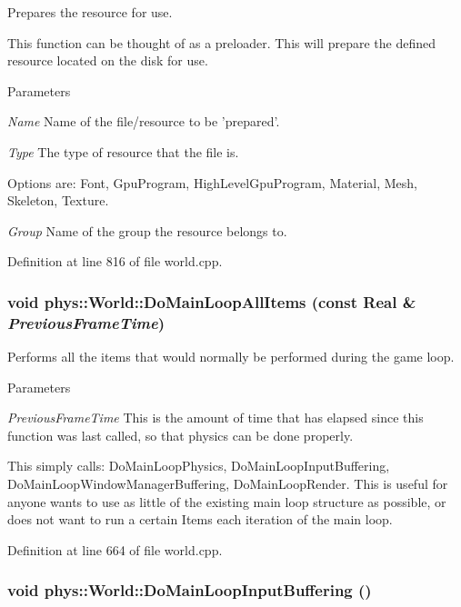 Prepares the resource for use. 

This function can be thought of as a preloader. This will prepare the defined resource located on the disk for use. 
\begin{DoxyParams}{Parameters}
\item[{\em Name}]Name of the file/resource to be 'prepared'. \item[{\em Type}]The type of resource that the file is. \par
 Options are: Font, GpuProgram, HighLevelGpuProgram, Material, Mesh, Skeleton, Texture. \item[{\em Group}]Name of the group the resource belongs to. \end{DoxyParams}


Definition at line 816 of file world.cpp.

\hypertarget{classphys_1_1World_a25c2583425bfe3d0d2bfce1093f0175e}{
\subsubsection[{DoMainLoopAllItems}]{\setlength{\rightskip}{0pt plus 5cm}void phys::World::DoMainLoopAllItems (const {\bf Real} \& {\em PreviousFrameTime})}}
\label{da/ddf/classphys_1_1World_a25c2583425bfe3d0d2bfce1093f0175e}


Performs all the items that would normally be performed during the game loop. 


\begin{DoxyParams}{Parameters}
\item[{\em PreviousFrameTime}]This is the amount of time that has elapsed since this function was last called, so that physics can be done properly.\end{DoxyParams}
This simply calls: DoMainLoopPhysics, DoMainLoopInputBuffering, DoMainLoopWindowManagerBuffering, DoMainLoopRender. This is useful for anyone wants to use as little of the existing main loop structure as possible, or does not want to run a certain Items each iteration of the main loop. 

Definition at line 664 of file world.cpp.

\hypertarget{classphys_1_1World_af4204b587fcc71e8313dd97d476378d6}{
\subsubsection[{DoMainLoopInputBuffering}]{\setlength{\rightskip}{0pt plus 5cm}void phys::World::DoMainLoopInputBuffering ()}}
\label{da/ddf/classphys_1_1World_af4204b587fcc71e8313dd97d476378d6}


